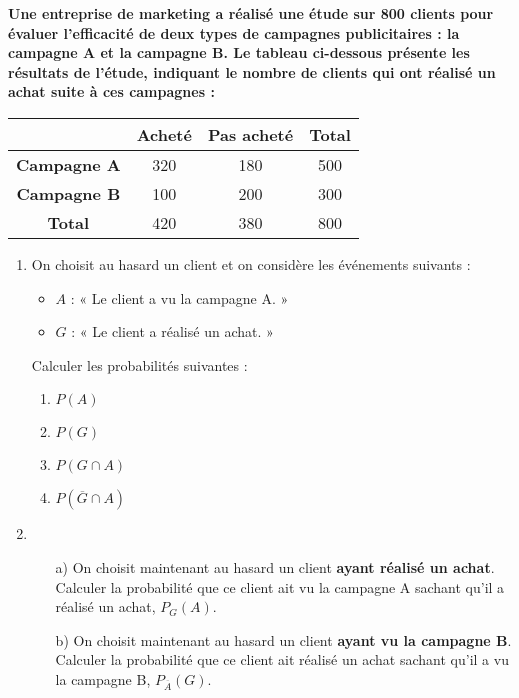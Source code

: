 \documentclass[11pt]{article}
\begin{document}
\begin{exercice}
  \textbf{Une entreprise de marketing a réalisé une étude sur 800 clients pour
  évaluer l'efficacité de deux types de campagnes publicitaires : la
  campagne A et la campagne B. Le tableau ci-dessous présente les
  résultats de l'étude, indiquant le nombre de clients qui ont réalisé
  un achat suite à ces campagnes :}

\begin{center}
  \begin{tabular}{|c|c|c|c|}
    \hline
    & \textbf{Acheté} & \textbf{Pas acheté} & \textbf{Total} \\
    \hline
    \textbf{Campagne A}   & 320             & 180                 & 500            \\
    \hline
    \textbf{Campagne B}   & 100             & 200                 & 300            \\
    \hline
    \textbf{Total}        & 420             & 380                 & 800            \\
    \hline
  \end{tabular}
\end{center}
    \begin{multicols}{2}
      \begin{enumerate}
      \item On choisit au hasard un client et on considère les
        événements suivants :
        \begin{itemize}
        \item \( A \) : « Le client a vu la campagne A. »
        \item \( G \) : « Le client a réalisé un achat. »
        \end{itemize}
        Calculer les probabilités suivantes :
        \begin{enumerate}
        \item \( P(A) \)
        \item \( P(G) \)
        \item \( P(G \cap A) \)
        \item \( P(\overline{G} \cap A) \)
        \end{enumerate}

        \item \begin{itemize}
        \item[a)] On choisit maintenant au hasard un client
          \textbf{ayant réalisé un achat}. Calculer la probabilité que
          ce client ait vu la campagne A sachant qu'il a réalisé un
          achat, \( P_G(A) \).
        \item[b)] On choisit maintenant au hasard un client
          \textbf{ayant vu la campagne B}. Calculer la probabilité que
          ce client ait réalisé un achat sachant qu'il a vu la
          campagne B, \( P_{\overline{A}}(G) \).
        \end{itemize}
      \end{enumerate}
    \end{multicols}
\end{exercice}
\end{document}
